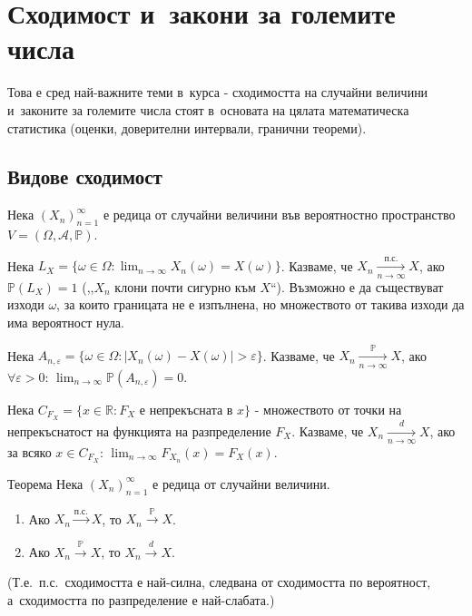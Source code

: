 \chapter{Сходимост и~закони за големите числа}

\begin{rembox}[Забележка]
Това е сред най-важните теми в~курса - сходимостта на случайни
величини и~законите за големите числа стоят в~основата на цялата
математическа статистика (оценки, доверителни интервали, гранични
теореми).
\end{rembox}

\section{Видове сходимост}

\begin{rembox}[Постановка]
Нека $(X_n)_{n=1}^{\infty}$ е редица от случайни величини във
вероятностно пространство $V=(\Omega,\mathcal A,\mathbb P)$.
\end{rembox}

\begin{defbox}
Нека $L_X = \{\omega\in\Omega : \lim_{n\to\infty}X_n(\omega)=X(\omega)\}$.
Казваме, че $X_n\xrightarrow[n\to\infty]{\text{п.с.}} X$, ако
$\mathbb P(L_X)=1$ (,,$X_n$ клони почти сигурно към $X$``). Възможно
е да съществуват изходи $\omega$, за които границата не е изпълнена,
но множеството от такива изходи да има вероятност нула.
\end{defbox}

\begin{defbox}
Нека $A_{n,\varepsilon} = \{\omega\in\Omega : |X_n(\omega)-X(\omega)|
>\varepsilon\}$. Казваме, че $X_n\xrightarrow[n\to\infty]{\mathbb P}
X$, ако $\forall\varepsilon>0$: $\lim_{n\to\infty}\mathbb
P(A_{n,\varepsilon})=0$.
\end{defbox}

\begin{defbox}
Нека $C_{F_X}=\{x\in\mathbb R : F_X\text{ е непрекъсната в~} x\}$ -
множеството от точки на непрекъснатост на функцията на разпределение
$F_X$. Казваме, че $X_n\xrightarrow[n\to\infty]{d} X$, ако за всяко
$x\in C_{F_X}$: $\lim_{n\to\infty}F_{X_n}(x)=F_X(x)$.
\end{defbox}

\begin{thmbox}[]{Теорема}
Нека $(X_n)_{n=1}^{\infty}$ е редица от случайни величини.
\begin{enumerate}[label=\alph*)]
  \item Ако $X_n\xrightarrow{\text{п.с.}}X$, то $X_n\xrightarrow{\mathbb P}X$.
  \item Ако $X_n\xrightarrow{\mathbb P}X$, то $X_n\xrightarrow{d}X$.
\end{enumerate}
(Т.е.\ п.с.\ сходимостта е най-силна, следвана от сходимостта по
вероятност, а~сходимостта по разпределение е най-слабата.)
\end{thmbox}


